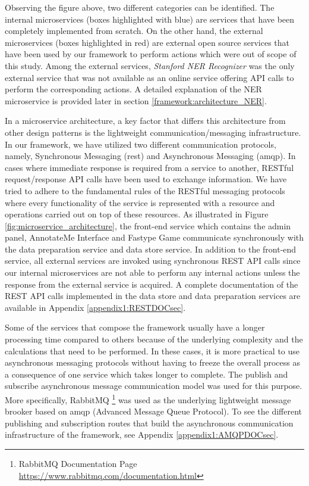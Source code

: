 Observing the figure above, two different categories can be identified. The internal microservices (boxes highlighted with blue) are services that have been completely implemented from scratch. On the other hand, the external microservices (boxes highlighted in red) are external open source services that have been used by our framework to perform actions which were out of scope of this study. Among the external services, \textit{Stanford NER Recognizer} was the only external service that was not available as an online service offering API calls to perform the corresponding actions. A detailed explanation of the NER microservice is provided later in section \ref{framework:architecture_NER}.

In a microservice architecture, a key factor that differs this architecture from other design patterns is the lightweight communication/messaging infrastructure. In our framework, we have utilized two different communication protocols, namely, Synchronous Messaging (\ac{rest}) and Asynchronous Messaging (\ac{amqp}). In cases where immediate response is required from a service to another, RESTful request/response API calls have been used to exchange information. We have tried to adhere to the fundamental rules of the RESTful messaging protocols where every functionality of the service is represented with a resource and operations carried out on top of these resources. As illustrated in Figure \ref{fig:microservice_architecture}, the front-end service which contains the admin panel, AnnotateMe Interface and Fastype Game communicate synchronously with the data preparation service and data store service. In addition to the front-end service, all external services are invoked using synchronous REST API calls since our internal microservices are not able to perform any internal actions unless the response from the external service is acquired. A complete documentation of the REST API calls implemented in the data store and data preparation services are available in Appendix \ref{appendix1:RESTDOCsec}.

Some of the services that compose the framework usually have a longer processing time compared to others because of the underlying complexity and the calculations that need to be performed. In these cases, it is more practical to use asynchronous messaging protocols without having to freeze the overall process as a consequence of one service which takes longer to complete. The publish and subscribe asynchronous message communication model was used for this purpose. More specifically, RabbitMQ \footnote{RabbitMQ Documentation Page \url{https://www.rabbitmq.com/documentation.html}} was used as the underlying lightweight message brooker based on \ac{amqp} (Advanced Message Queue Protocol). To see the different publishing and subscription routes that build the asynchronous communication infrastructure of the framework, see Appendix \ref{appendix1:AMQPDOCsec}.


